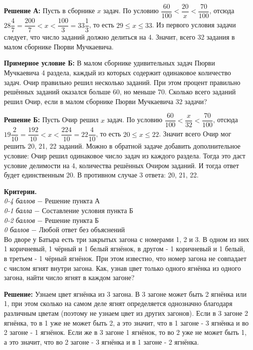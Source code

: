\textbf{Решение А:} Пусть в сборнике $x$ задач. По условию $\dfrac{60}{100}<\dfrac{20}{x}<\dfrac{70}{100}$, отсюда $28 \dfrac{4}{7}=\dfrac{200}{7}<x<\dfrac{100}{3}=33 \dfrac{1}{3}$, то есть $29 \leq x \leq 33$. Из первого условия задачи следует, что число заданий должно делиться на 4. Значит, всего 32 задания в малом сборнике Пюрви Мучкаевича.

\textbf{Примерное условие Б:} В малом сборнике удивительных задач Пюрви Мучкаевича 4 раздела, каждый из которых содержит одинаковое количество задач. Очир правильно решил несколько заданий. При этом процент правильно решённых заданий оказался больше 60, но меньше 70. Сколько всего заданий решил Очир, если в малом сборнике Пюрви Мучкаевича 32 задачи?

\textbf{Решение Б:} Пусть Очир решил $x$ задач. По условию $\dfrac{60}{100}<\dfrac{x}{32}<\dfrac{70}{100}$, отсюда $19 \dfrac{2}{10}=\dfrac{192}{10}<x<\dfrac{224}{10}=22 \dfrac{4}{10}$, то есть $20 \leq x \leq 22$. Значит всего Очир мог решить 20, 21, 22 заданий. Можно в обратной задаче добавить дополнительное условие: Очир решил одинаковое число задач из каждого раздела. Тогда это даст условие делимости на 4, количества решённых Очиром заданий. И тогда ответ будет единственным 20. В противном случае 3 ответа: 20, 21, 22.

\textbf{Критерии.} \\
\textit{0-4 баллов} $-$ Решение пункта А\\
\textit{0-1 балла} $-$ Составление условия пункта Б \\
\textit{0-2 баллов} $-$ Решение пункта Б\\
\textit{0 баллов} $-$ Любой ответ без объяснений\\

 Во дворе у Батыра есть три закрытых загона с номерами 1, 2 и 3. В одном из них 1 коричневый, 1 чёрный и 1 белый ягнёнок, в другом - 1 коричневый и 1 белый, в третьем - 1 чёрный ягнёнок. При этом известно, что номер загона не совпадает с числом ягнят внутри загона. Как, узнав цвет только одного ягнёнка из одного загона, найти число ягнят в каждом загоне?

\textbf{Решение:} Узнаем цвет ягнёнка из 3 загона. В 3 загоне может быть 2 ягнёнка или 1, при этом сколько на самом деле ягнят определяется однозначно благодаря различным цветам (поэтому не узнаем цвет из других загонов). Если в 3 загоне 2 ягнёнка, то в 1 уже не может быть 2, а это значит, что в 1 загоне - 3 ягнёнка и во 2 загоне - 1 ягнёнок. Если же в 3 загоне 1 ягнёнок, то во 2 уже не может быть 1, а это значит, что во 2 загоне - 3 ягнёнка и в 1 загоне - 2 ягнёнка. 

